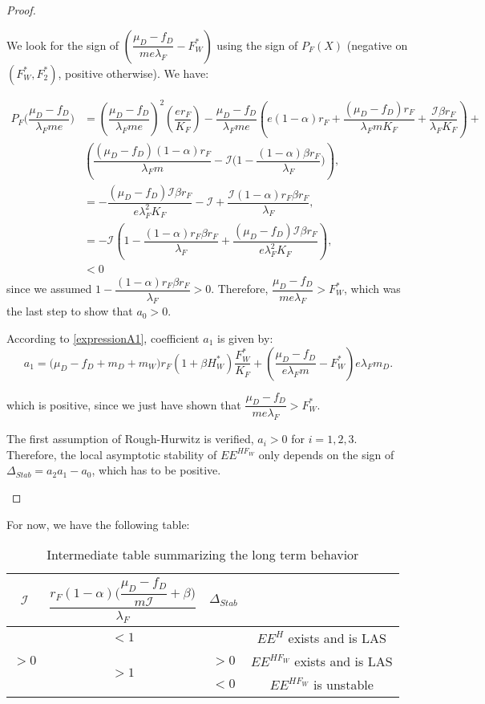 \documentclass{article}
\newcommand{\lfw}{\lambda_{F}}
\newcommand{\lfw}{\lambda_{F}}
\newcommand{\cI}{\mathcal{I}}
\begin{document}
\begin{proof}
\begin{itemize}
We look for the sign of $\left(\dfrac{\mu_D -f_D}{m e\lfw} - F^*_{W}\right)$ using the sign of $P_F(X)$ (negative on $(F^*_W, F^*_2)$, positive otherwise). We have:

\begin{align*}
P_F\Big(\dfrac{\mu_D - f_D}{\lfw m e}\Big) &= \left(\dfrac{\mu_D - f_D}{\lfw m e}\right)^2 \left(\dfrac{er_F}{K_F} \right) - \dfrac{\mu_D - f_D}{\lfw m e} \left(e(1-\alpha)r_F + \dfrac{(\mu_D - f_D) r_F}{\lfw m K_F} + \dfrac{\cI \beta r_F}{\lfw K_F} \right) + \\ & \left(\dfrac{(\mu_D - f_D)(1-\alpha) r_F}{\lfw m} - \cI\Big(1 - \dfrac{(1-\alpha)\beta r_F}{\lfw} \Big) \right), \\
&= - \dfrac{(\mu_D - f_D) \cI \beta r_F}{e \lfw ^2 K_F} - \cI + \dfrac{\cI (1-\alpha)r_F \beta r_F}{\lfw}, \\
&= -\cI \left( 1 - \dfrac{(1-\alpha)r_F \beta r_F}{\lfw} + \dfrac{(\mu_D - f_D) \cI \beta r_F}{e \lfw ^2 K_F} \right), \\
& < 0
\end{align*}
since we assumed $1 - \dfrac{(1-\alpha)r_F \beta r_F}{\lfw} > 0$. Therefore, $\dfrac{\mu_D - f_D}{m e\lfw} > F^*_{W}$, which was the last step to show that $a_0>0$. 

According to \eqref{expressionA1}, coefficient $a_1$ is given by:
\begin{equation*}
a_1 = \big( \mu_D  -f_D + m_D + m_W) r_F(1+ \beta H_W^*) \dfrac{F^*_W}{K_F} + \left(\dfrac{\mu_D -f_D}{e\lfw m} - F_W^*\right) e \lfw m_D .
\end{equation*}

which is positive, since we just have shown that $\dfrac{\mu_D - f_D}{m e\lfw} > F^*_{W}$.

The first assumption of Rough-Hurwitz is verified, $a_i > 0$ for $i=1,2,3$. Therefore, the local asymptotic stability of $EE^{HF_W}$ only depends on the sign of $\Delta_{Stab}= a_2 a_1 - a_0$, which has to be positive.

\end{itemize}





\end{proof}

For now, we have the following table:
\begin{table}[ht!]
\def\arraystretch{2}
\centering
\begin{tabular}{c|c|c|c}
$\cI$ & $\dfrac{r_F(1-\alpha)\Big({\dfrac{\mu_D - f_D}{m\cI}+\beta\Big)}}{\lfw} $ & $\Delta_{Stab}$ & \\
\hline
\multirow{3}{*}{$>0$} & $<1$ & &$EE^{H}$ exists and is LAS \\
\cline{2-4}
 & \multirow{2}{*}{$> 1$}  & $>0$ &$EE^{HF_W}$ exists and is LAS\\
 \cline{3-4}
 & & $ < 0$ & $EE^{HF_W}$ is unstable \\
\end{tabular}
\caption{Intermediate table summarizing the long term behavior}
\end{table}
\end{document}
